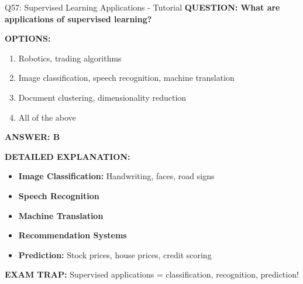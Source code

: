 \documentclass[8pt]{beamer}
\begin{document}
	\begin{frame}{Q57: Supervised Learning Applications - Tutorial}
		\fontsize{6.5}{7.5}\selectfont
		\textbf{QUESTION: What are applications of supervised learning?}
		
		\vspace{0.1cm}
		\textbf{OPTIONS:}
		\begin{enumerate}
			\item Robotics, trading algorithms
			\item Image classification, speech recognition, machine translation
			\item Document clustering, dimensionality reduction
			\item All of the above
		\end{enumerate}
		
		\vspace{0.1cm}
		\textcolor{myblue}{\textbf{ANSWER: B}}
		
		\vspace{0.1cm}
		\textbf{DETAILED EXPLANATION:}
		\begin{itemize}
			\item \textbf{Image Classification:} Handwriting, faces, road signs
			\item \textbf{Speech Recognition}
			\item \textbf{Machine Translation}
			\item \textbf{Recommendation Systems}
			\item \textbf{Prediction:} Stock prices, house prices, credit scoring
		\end{itemize}
		
		\vspace{0.1cm}
		\textcolor{myred}{\textbf{EXAM TRAP:}} Supervised applications = \textcolor{myblue}{classification, recognition, prediction}!
	\end{frame}
	
\end{document}
